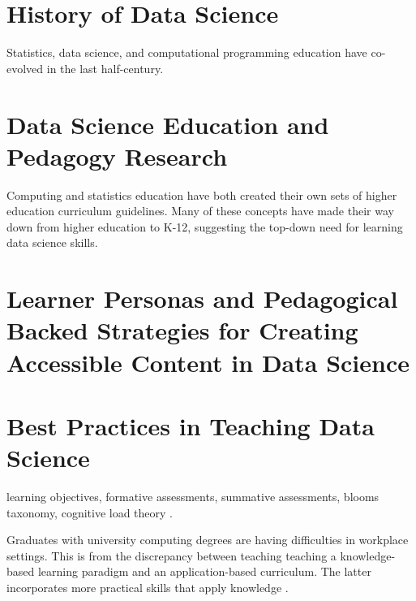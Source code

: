 \documentclass[../main.tex]{subfiles}
\begin{document}
    

    \section{History of Data Science}
        \label{se:intro-ds-history}

        Statistics, data science, and computational programming education
        have co-evolved in the last half-century.

        
        
        
        
        

    \section{Data Science Education and Pedagogy Research}
        \label{se:intro-ds-edu-ped}
    
        Computing and statistics education have both created their own sets of
        higher education curriculum guidelines.
        Many of these concepts have made their way down from higher education to K-12,
        suggesting the top-down need for learning data science skills.

        
        
        
        
    \section{Learner Personas and Pedagogical Backed Strategies for Creating Accessible Content in Data Science}
        \label{se:intro-personas}

        
        
    \section{Best Practices in Teaching Data Science}
        \label{se:intro-teaching-best-practices-ds}

        learning objectives, formative assessments, summative assessments, blooms taxonomy,
        cognitive load theory
        \cite{DonaldClarkPlan2020}.

        Graduates with university computing degrees are having difficulties in workplace settings.
        This is from the discrepancy between teaching teaching a knowledge-based learning paradigm and an application-based curriculum.
        The latter incorporates more practical skills that apply knowledge
        \cite{cc2005}.
\end{document}
